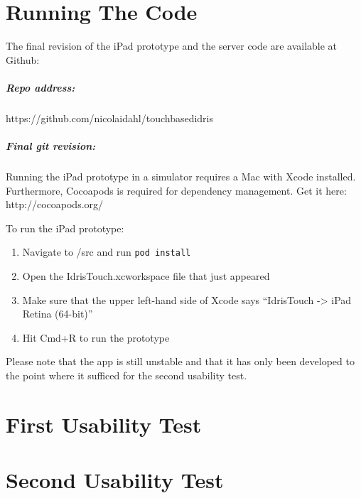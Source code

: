 \appendix
\label{Appendix}
\chapter{Running The Code}
\label{chap:RunningTheCode}
The final revision of the iPad prototype and the server code are available at
Github: 
\paragraph{Repo address:} https://github.com/nicolaidahl/touchbasedidris
\paragraph{Final git revision:} 
\paragraph{}
Running the iPad prototype in a simulator requires a Mac with Xcode installed. Furthermore,
Cocoapods is required for dependency management. Get it here: http://cocoapods.org/

To run the iPad prototype: 
\begin{enumerate}
	\item Navigate to /src and run \texttt{pod install}
	\item Open the IdrisTouch.xcworkspace file that just appeared
	\item Make sure that the upper left-hand side of Xcode says ``IdrisTouch -> iPad
	Retina (64-bit)''
	\item Hit Cmd+R to run the prototype
\end{enumerate}

Please note that the app is still unstable and that it has only been developed
to the point where it sufficed for the second usability test.

\chapter{First Usability Test}
\label{chap:FirstUsabilityTest}


\chapter{Second Usability Test}
\label{chap:SecondUsabilityTest}


